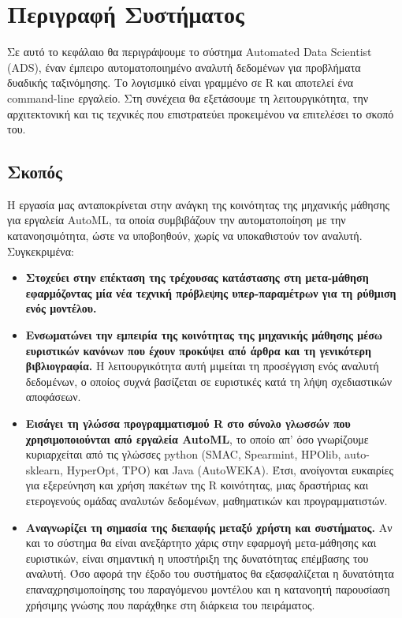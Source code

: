 \chapter{Περιγραφή Συστήματος}
Σε αυτό το κεφάλαιο θα περιγράψουμε το σύστημα Automated Data Scientist (ADS), έναν έμπειρο αυτοματοποιημένο αναλυτή δεδομένων για προβλήματα δυαδικής ταξινόμησης. Το λογισμικό είναι γραμμένο σε R και αποτελεί ένα command-line εργαλείο. Στη συνέχεια θα εξετάσουμε τη λειτουργικότητα, την αρχιτεκτονική και τις τεχνικές που επιστρατεύει προκειμένου να επιτελέσει το σκοπό του.
\section{Σκοπός}
Η εργασία μας ανταποκρίνεται στην ανάγκη της κοινότητας της μηχανικής μάθησης για εργαλεία AutoML, τα οποία συμβιβάζουν την αυτοματοποίηση με την κατανοησιμότητα, ώστε να υποβοηθούν, χωρίς να υποκαθιστούν τον αναλυτή. Συγκεκριμένα:
\begin{itemize}
	\item \textbf{Στοχεύει στην επέκταση της τρέχουσας κατάστασης στη μετα-μάθηση εφαρμόζοντας μία νέα τεχνική πρόβλεψης υπερ-παραμέτρων για τη ρύθμιση ενός μοντέλου.}
	\item  \textbf{Ενσωματώνει την εμπειρία της κοινότητας της μηχανικής μάθησης μέσω ευριστικών κανόνων που έχουν προκύψει από άρθρα και τη γενικότερη βιβλιογραφία.} Η λειτουργικότητα αυτή μιμείται τη προσέγγιση ενός αναλυτή δεδομένων, ο οποίος συχνά βασίζεται σε ευριστικές κατά τη λήψη σχεδιαστικών αποφάσεων.
	\item \textbf{Εισάγει τη γλώσσα προγραμματισμού R στο σύνολο γλωσσών που χρησιμοποιούνται από εργαλεία AutoML}, το οποίο απ' όσο γνωρίζουμε κυριαρχείται από τις γλώσσες python (SMAC, Spearmint, HPOlib, auto-sklearn, HyperOpt, TPO) και Java (AutoWEKA). Έτσι, ανοίγονται ευκαιρίες για εξερεύνηση και χρήση πακέτων της R κοινότητας, μιας δραστήριας και ετερογενούς ομάδας αναλυτών δεδομένων, μαθηματικών και προγραμματιστών.
	\item \textbf{Αναγνωρίζει τη σημασία της διεπαφής μεταξύ χρήστη και συστήματος.} Αν και το σύστημα θα είναι ανεξάρτητο χάρις στην εφαρμογή μετα-μάθησης και ευριστικών, είναι σημαντική η υποστήριξη της δυνατότητας επέμβασης του αναλυτή. Όσο αφορά την έξοδο του συστήματος θα εξασφαλίζεται η δυνατότητα επαναχρησιμοποίησης του παραγόμενου μοντέλου και η  κατανοητή παρουσίαση χρήσιμης γνώσης που παράχθηκε στη διάρκεια του πειράματος. 
\end{itemize} 

